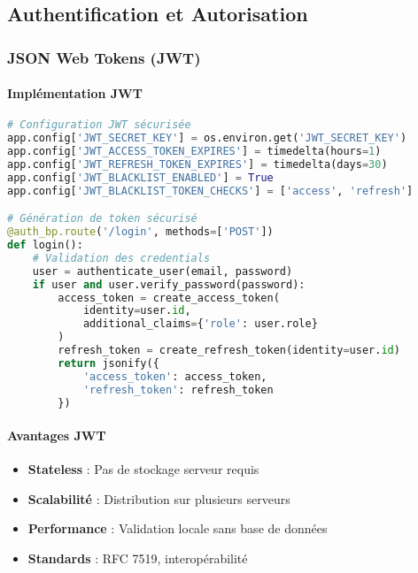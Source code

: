 \subsection{Authentification et Autorisation}

\subsubsection{JSON Web Tokens (JWT)}

\paragraph{Implémentation JWT}
\begin{lstlisting}[language=python]
# Configuration JWT sécurisée
app.config['JWT_SECRET_KEY'] = os.environ.get('JWT_SECRET_KEY')
app.config['JWT_ACCESS_TOKEN_EXPIRES'] = timedelta(hours=1)
app.config['JWT_REFRESH_TOKEN_EXPIRES'] = timedelta(days=30)
app.config['JWT_BLACKLIST_ENABLED'] = True
app.config['JWT_BLACKLIST_TOKEN_CHECKS'] = ['access', 'refresh']

# Génération de token sécurisé
@auth_bp.route('/login', methods=['POST'])
def login():
    # Validation des credentials
    user = authenticate_user(email, password)
    if user and user.verify_password(password):
        access_token = create_access_token(
            identity=user.id,
            additional_claims={'role': user.role}
        )
        refresh_token = create_refresh_token(identity=user.id)
        return jsonify({
            'access_token': access_token,
            'refresh_token': refresh_token
        })
\end{lstlisting}

\paragraph{Avantages JWT}
\begin{itemize}
    \item \textbf{Stateless} : Pas de stockage serveur requis
    \item \textbf{Scalabilité} : Distribution sur plusieurs serveurs
    \item \textbf{Performance} : Validation locale sans base de données
    \item \textbf{Standards} : RFC 7519, interopérabilité
\end{itemize}

